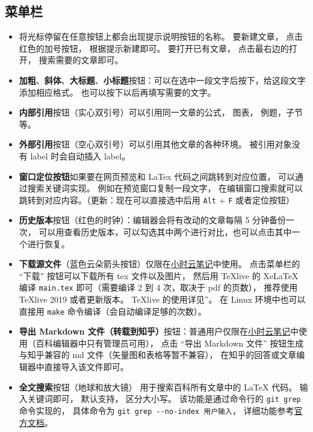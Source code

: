 \subsection{菜单栏}
\begin{itemize}
\item 将光标停留在任意按钮上都会出现提示说明按钮的名称。 要新建文章， 点击红色的加号按钮， 根据提示新建即可。 要打开已有文章， 点击最右边的打开， 搜索需要的文章即可。
\item \textbf{加粗}、\textbf{斜体}、\textbf{大标题}、\textbf{小标题}按钮：可以在选中一段文字后按下，给这段文字添加相应格式。 也可以按下以后再填写需要的文字。
\item \textbf{内部引用}按钮（实心双引号）可以引用同一文章的公式， 图表， 例题，子节等。
\item \textbf{外部引用}按钮（空心双引号）可以引用其他文章的各种环境。 被引用对象没有 label 时会自动插入 label。
\item \textbf{窗口定位按钮}如果要在网页预览和 LaTex 代码之间跳转到对应位置， 可以通过搜索关键词实现。 例如在预览窗口复制一段文字， 在编辑窗口搜索就可以跳转到对应内容。（更新：现在可以直接选中后用 \verb`Alt` + \verb`F` 或者定位按钮）
\item \textbf{历史版本}按钮（红色的时钟）：编辑器会将有改动的文章每隔 5 分钟备份一次， 可以用查看历史版本，可以勾选其中两个进行对比，也可以点击其中一个进行恢复。
\item \textbf{下载源文件}（蓝色云朵箭头按钮）仅限在\href{http://wuli.wiki/note/}{小时云笔记}中使用。 点击菜单栏的 “下载” 按钮可以下载所有 tex 文件以及图片， 然后用 TeXlive 的 XeLaTeX 编译 \verb|main.tex| 即可（需要编译 2 到 4 次，取决于 pdf 的页数）， 推荐使用 TeXlive 2019 或者更新版本。 TeXlive 的使用详见”。 在 Linux 环境中也可以直接用 \verb|make| 命令编译（会自动编译足够的次数）。
\item \textbf{导出 Markdown 文件（转载到知乎）}按钮：普通用户仅限在\href{http://wuli.wiki/note/}{小时云笔记}中使用（百科编辑器中只有管理员可用）， 点击 “导出 Markdown 文件” 按钮生成与知乎兼容的 md 文件（矢量图和表格等暂不兼容）， 在知乎的回答或文章编辑器中直接导入该文件即可。
\item \textbf{全文搜索}按钮（地球和放大镜） 用于搜索百科所有文章中的 LaTeX 代码。 输入关键词即可， 默认支持， 区分大小写。 该功能是通过命令行的 \verb|git grep| 命令实现的， 具体命令为 \verb|git grep --no-index 用户输入|， 详细功能参考\href{https://git-scm.com/docs/git-grep}{官方文档}。
\end{itemize}

